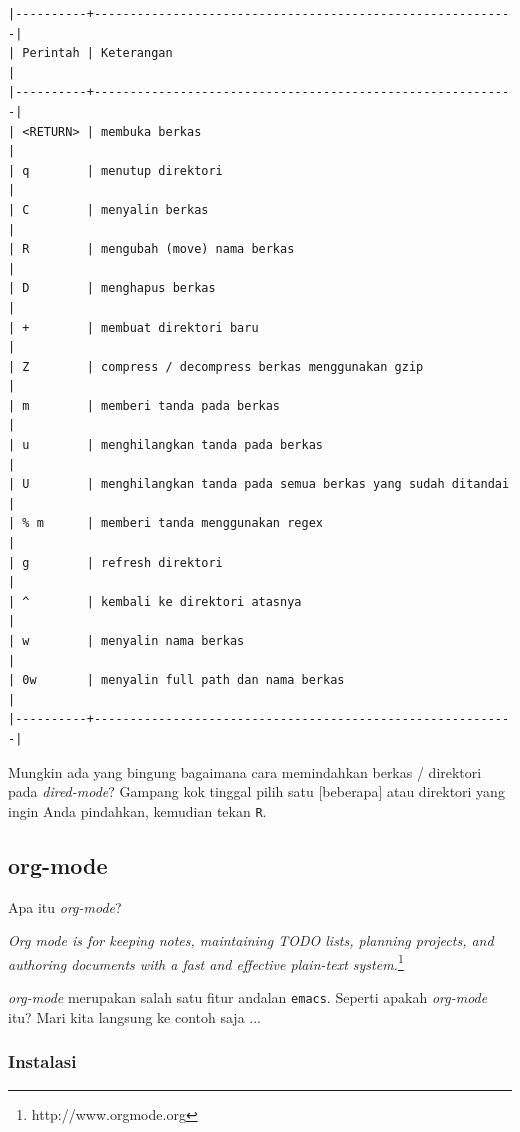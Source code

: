 \documentclass{article}
\begin{document}
\begin{verbatim}
|----------+-----------------------------------------------------------|
| Perintah | Keterangan                                                |
|----------+-----------------------------------------------------------|
| <RETURN> | membuka berkas                                            |
| q        | menutup direktori                                         |
| C        | menyalin berkas                                           |
| R        | mengubah (move) nama berkas                               |
| D        | menghapus berkas                                          |
| +        | membuat direktori baru                                    |
| Z        | compress / decompress berkas menggunakan gzip             |
| m        | memberi tanda pada berkas                                 |
| u        | menghilangkan tanda pada berkas                           |
| U        | menghilangkan tanda pada semua berkas yang sudah ditandai |
| % m      | memberi tanda menggunakan regex                           |
| g        | refresh direktori                                         |
| ^        | kembali ke direktori atasnya                              |
| w        | menyalin nama berkas                                      |
| 0w       | menyalin full path dan nama berkas                        |
|----------+-----------------------------------------------------------|
\end{verbatim}

Mungkin ada yang bingung bagaimana cara memindahkan berkas / direktori
pada \emph{dired-mode}? Gampang kok tinggal pilih satu [beberapa] atau 
direktori yang ingin Anda pindahkan, kemudian tekan \verb=R=.

\subsection{org-mode}
Apa itu \emph{org-mode}? 

\emph{Org mode is for keeping notes, maintaining TODO lists, planning projects, and authoring documents with a fast and effective plain-text system.}\footnote{http://www.orgmode.org}

\emph{org-mode} merupakan salah satu fitur andalan \verb=emacs=. Seperti apakah
\emph{org-mode} itu? Mari kita langsung ke contoh saja ...

\subsubsection{Instalasi}
\end{document}
